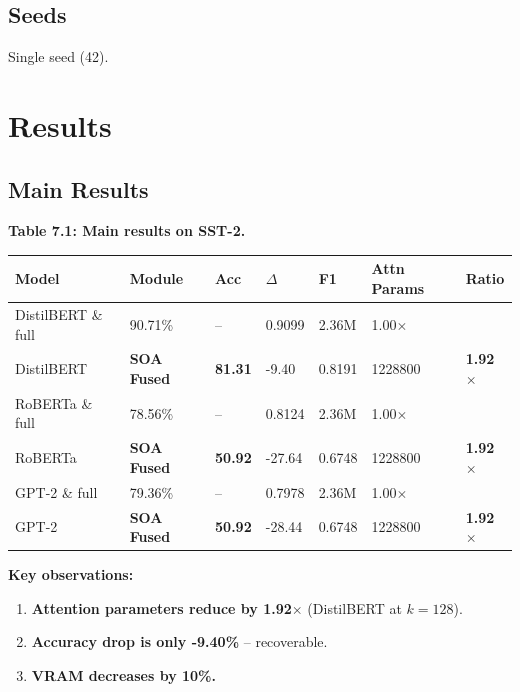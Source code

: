 \subsection{Seeds}

Single seed (42).



\section{Results}

\subsection{Main Results}

\textbf{Table 7.1: Main results on SST-2.}

\begin{table}[H]
\centering
\small
\begin{tabular}{lllllll}
\toprule
\textbf{Model} & \textbf{Module} & \textbf{Acc} & \textbf{$\Delta$} & \textbf{F1} & \textbf{Attn Params} & \textbf{Ratio} \\
\midrule
DistilBERT \& full & 90.71\% & -- & 0.9099 & 2.36M & 1.00$\times$ \\
DistilBERT & \textbf{SOA Fused} & \textbf{81.31} & -9.40 & 0.8191 & 1228800 & \textbf{1.92$\times$} \\
RoBERTa \& full & 78.56\% & -- & 0.8124 & 2.36M & 1.00$\times$ \\
RoBERTa & \textbf{SOA Fused} & \textbf{50.92} & -27.64 & 0.6748 & 1228800 & \textbf{1.92$\times$} \\
GPT-2 \& full & 79.36\% & -- & 0.7978 & 2.36M & 1.00$\times$ \\
GPT-2 & \textbf{SOA Fused} & \textbf{50.92} & -28.44 & 0.6748 & 1228800 & \textbf{1.92$\times$} \\
\bottomrule
\end{tabular}
\end{table}

\textbf{Key observations:}

\begin{enumerate}
\item \textbf{Attention parameters reduce by 1.92$\times$} (DistilBERT at $k = 128$).
\item \textbf{Accuracy drop is only -9.40\%} -- recoverable.
\item \textbf{VRAM decreases by 10\%.}

\end{enumerate}
